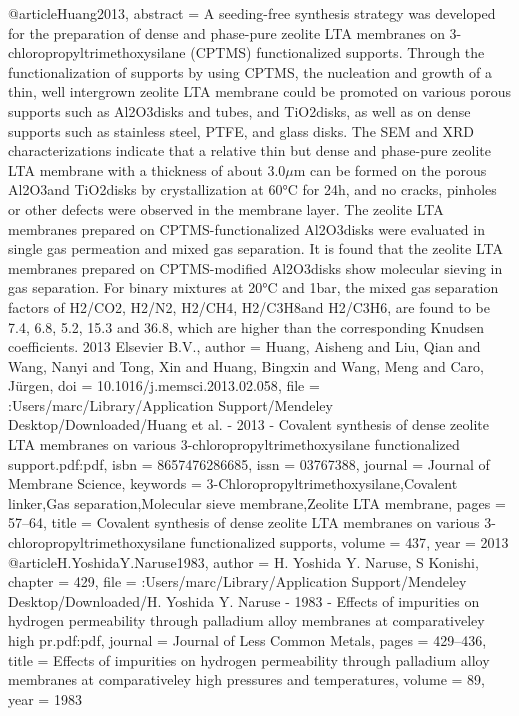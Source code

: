 @article{Huang2013,
abstract = {A seeding-free synthesis strategy was developed for the preparation of dense and phase-pure zeolite LTA membranes on 3-chloropropyltrimethoxysilane (CPTMS) functionalized supports. Through the functionalization of supports by using CPTMS, the nucleation and growth of a thin, well intergrown zeolite LTA membrane could be promoted on various porous supports such as Al2O3disks and tubes, and TiO2disks, as well as on dense supports such as stainless steel, PTFE, and glass disks. The SEM and XRD characterizations indicate that a relative thin but dense and phase-pure zeolite LTA membrane with a thickness of about 3.0$\mu$m can be formed on the porous Al2O3and TiO2disks by crystallization at 60°C for 24h, and no cracks, pinholes or other defects were observed in the membrane layer. The zeolite LTA membranes prepared on CPTMS-functionalized Al2O3disks were evaluated in single gas permeation and mixed gas separation. It is found that the zeolite LTA membranes prepared on CPTMS-modified Al2O3disks show molecular sieving in gas separation. For binary mixtures at 20°C and 1bar, the mixed gas separation factors of H2/CO2, H2/N2, H2/CH4, H2/C3H8and H2/C3H6, are found to be 7.4, 6.8, 5.2, 15.3 and 36.8, which are higher than the corresponding Knudsen coefficients. {\textcopyright} 2013 Elsevier B.V.},
author = {Huang, Aisheng and Liu, Qian and Wang, Nanyi and Tong, Xin and Huang, Bingxin and Wang, Meng and Caro, J{\"{u}}rgen},
doi = {10.1016/j.memsci.2013.02.058},
file = {:Users/marc/Library/Application Support/Mendeley Desktop/Downloaded/Huang et al. - 2013 - Covalent synthesis of dense zeolite LTA membranes on various 3-chloropropyltrimethoxysilane functionalized support.pdf:pdf},
isbn = {8657476286685},
issn = {03767388},
journal = {Journal of Membrane Science},
keywords = {3-Chloropropyltrimethoxysilane,Covalent linker,Gas separation,Molecular sieve membrane,Zeolite LTA membrane},
pages = {57--64},
title = {{Covalent synthesis of dense zeolite LTA membranes on various 3-chloropropyltrimethoxysilane functionalized supports}},
volume = {437},
year = {2013}
}
@article{H.YoshidaY.Naruse1983,
author = {{H. Yoshida  Y. Naruse}, S Konishi},
chapter = {429},
file = {:Users/marc/Library/Application Support/Mendeley Desktop/Downloaded/H. Yoshida Y. Naruse - 1983 - Effects of impurities on hydrogen permeability through palladium alloy membranes at comparativeley high pr.pdf:pdf},
journal = {Journal of Less Common Metals},
pages = {429--436},
title = {{Effects of impurities on hydrogen permeability through palladium alloy membranes at comparativeley high pressures and temperatures}},
volume = {89},
year = {1983}
}

